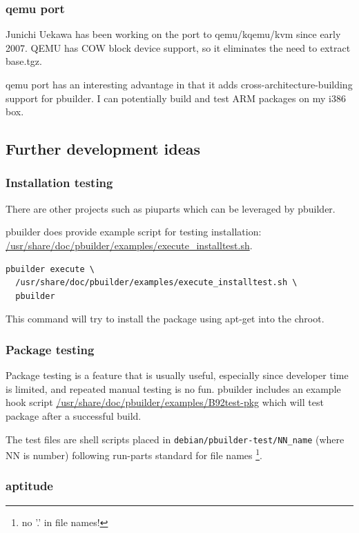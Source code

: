 \documentclass[a4paper]{article}
\begin{document}
\subsubsection{qemu port}

Junichi Uekawa has been working on the port to qemu/kqemu/kvm since
early 2007. QEMU has COW block device support, so it eliminates the need
to extract base.tgz.

qemu port has an interesting advantage in that it adds
cross-architecture-building support for pbuilder. I can potentially
build and test ARM packages on my i386 box.

\subsection{Further development ideas}

\subsubsection{Installation testing}

There are other projects such as piuparts which can be leveraged by
pbuilder.  

pbuilder does provide example script for testing installation:
\url{/usr/share/doc/pbuilder/examples/execute_installtest.sh}.

\begin{verbatim}
pbuilder execute \
  /usr/share/doc/pbuilder/examples/execute_installtest.sh \
  pbuilder
\end{verbatim}

This command will try to install the package using apt-get into the
chroot.

\subsubsection{Package testing}

Package testing is a feature that is usually useful, especially since
developer time is limited, and repeated manual testing is no fun.
pbuilder includes an example hook script
\url{/usr/share/doc/pbuilder/examples/B92test-pkg} which will test
package after a successful build.

The test files are shell scripts placed in
\verb!debian/pbuilder-test/NN_name! (where NN is number) following
run-parts standard for file names \footnote{no '.' in file names!}.

\subsubsection{aptitude}
\end{document}
